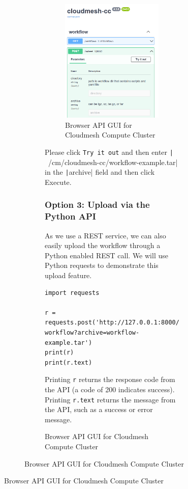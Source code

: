 \begin{figure}[htb]
\begin{figure}[htb]
\begin{figure}[htb]
\begin{figure}
\centering
\includegraphics[width=0.7\columnwidth]{images/upload_api.png}
\caption{Browser API GUI for Cloudmesh Compute Cluster}
\end{figure}

Please click \texttt{Try\ it\ out} and then enter \newline
\texttt|~/cm/cloudmesh-cc/workflow-example.tar| in the
\texttt|archive| field and then click Execute.

\subsubsection{Option 3: Upload via the Python
API}\label{option-3-upload-via-the-python-api}

As we use a REST service, we can also easily upload the workflow through
a Python enabled REST call. We will use Python requests to demonstrate
this upload feature.

\smallskip
\begin{verbatim}
import requests

r = requests.post('http://127.0.0.1:8000/ workflow?archive=workflow-example.tar')
print(r)
print(r.text)
\end{verbatim}
\smallskip

Printing \texttt{r} returns the response code from the API (a code of
200 indicates success). Printing \texttt{r.text} returns the message
from the API, such as a success or error message.


\end{figure}
\end{figure}
\end{figure}
